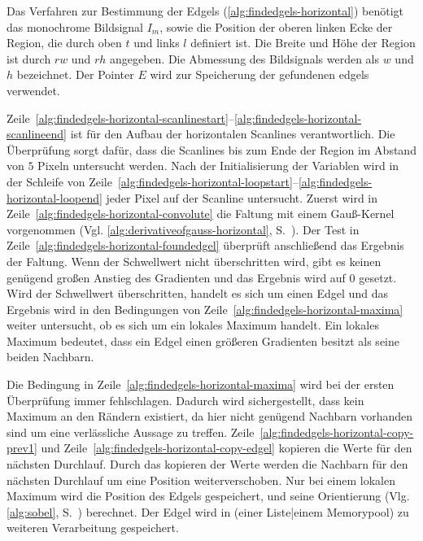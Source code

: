 Das Verfahren zur Bestimmung der Edgels (\autoref{alg:findedgels-horizontal}) benötigt das monochrome Bildsignal $I_m$,
 sowie die Position der oberen linken Ecke der Region, die durch oben $t$ und links $l$ definiert ist. Die Breite und
 Höhe der Region ist durch $\mathit{rw}$ und $\mathit{rh}$ angegeben. Die Abmessung des Bildsignals werden als $w$ und
 $h$ bezeichnet. Der Pointer $E$ wird zur Speicherung der gefundenen \glspl{edgel} verwendet.



Zeile~\ref{alg:findedgels-horizontal-scanlinestart}--\ref{alg:findedgels-horizontal-scanlineend} ist für den Aufbau der
 horizontalen Scanlines verantwortlich. Die Überprüfung sorgt dafür, dass die Scanlines bis zum Ende der Region im
 Abstand von $5$ Pixeln untersucht werden. Nach der Initialisierung der Variablen wird in der Schleife von
 Zeile~\ref{alg:findedgels-horizontal-loopstart}--\ref{alg:findedgels-horizontal-loopend} jeder Pixel auf der Scanline
 untersucht. Zuerst wird in Zeile~\ref{alg:findedgels-horizontal-convolute} die Faltung mit einem Gauß-Kernel
 vorgenommen (Vgl. \autoref{alg:derivativeofgauss-horizontal}, S.~\pageref{alg:derivativeofgauss-horizontal}). Der Test
 in Zeile~\ref{alg:findedgels-horizontal-foundedgel} überprüft anschließend das Ergebnis der Faltung. Wenn der
 Schwellwert nicht überschritten wird, gibt es keinen genügend großen Anstieg des Gradienten und das Ergebnis wird auf
 $0$ gesetzt. Wird der Schwellwert überschritten, handelt es sich um einen Edgel und das Ergebnis wird in den
 Bedingungen von Zeile~\ref{alg:findedgels-horizontal-maxima} weiter untersucht, ob es sich um ein lokales Maximum
 handelt. Ein lokales Maximum bedeutet, dass ein Edgel einen größeren Gradienten besitzt als seine beiden Nachbarn.

Die Bedingung in Zeile~\ref{alg:findedgels-horizontal-maxima} wird bei der ersten Überprüfung immer fehlschlagen.
 Dadurch wird sichergestellt, dass kein Maximum an den Rändern existiert, da hier nicht genügend Nachbarn vorhanden sind
 um eine verlässliche Aussage zu treffen. Zeile~\ref{alg:findedgels-horizontal-copy-prev1} und
 Zeile~\ref{alg:findedgels-horizontal-copy-edgel} kopieren die Werte für den nächsten Durchlauf. Durch das kopieren der
 Werte werden die Nachbarn für den nächsten Durchlauf um eine Position weiterverschoben. Nur bei einem lokalen Maximum
 wird die Position des Edgels gespeichert, und seine Orientierung (Vlg. \autoref{alg:sobel},
 S.~\pageref{alg:sobel}) berechnet. Der Edgel wird in (einer Liste|einem Memorypool) zu weiteren Verarbeitung
 gespeichert.

